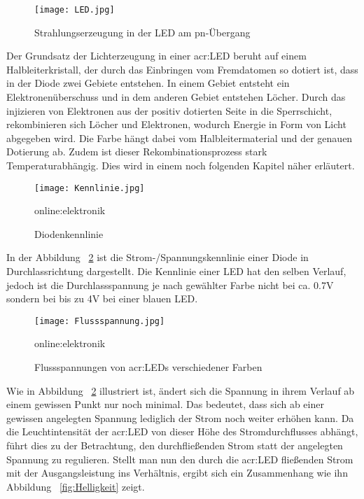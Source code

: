\begin{figure}[h]
	\centering
	\texttt{[image: LED.jpg]}
	\caption[Strahlungserzeugung in der LED am pn-Übergang]{Strahlungserzeugung in der LED am pn-Übergang} \cite{slabke}
	\label{fig:LED}
\end{figure}

Der Grundsatz der Lichterzeugung in einer \gls{acr:LED} beruht auf einem Halbleiterkristall, der durch das Einbringen vom Fremdatomen so dotiert ist, dass in der Diode zwei Gebiete entstehen. In einem Gebiet entsteht ein Elektronenüberschuss und in dem anderen Gebiet entstehen Löcher. Durch das injizieren von Elektronen aus der positiv dotierten Seite in die Sperrschicht, rekombinieren sich Löcher und Elektronen, wodurch Energie in Form von Licht abgegeben wird.\cite{slabke} Die Farbe hängt dabei vom Halbleitermaterial und der genauen Dotierung ab. Zudem ist dieser Rekombinationsprozess stark Temperaturabhängig. Dies wird in einem noch folgenden Kapitel näher erläutert.

\begin{figure}[h]
	\centering
	\texttt{[image: Kennlinie.jpg]}
	\caption[Diodenkennlinie]{Diodenkennlinie} 
	\gls{online:elektronik}
	\label{fig:Kennlinie}
\end{figure}


In der Abbildung ~\ref{fig:Kennlinie} ist die Strom-/Spannungskennlinie einer Diode in Durchlassrichtung
dargestellt. Die Kennlinie einer LED hat den selben Verlauf, jedoch ist die Durchlassspannung
je nach gewählter Farbe nicht bei ca. 0.7V sondern bei bis zu 4V bei
einer blauen LED. 

\begin{figure}[h]
	\centering
	\texttt{[image: Flussspannung.jpg]}
	\caption[Flussspannungen von \gls{acr:LED}s verschiedener Farben]{Flussspannungen von \gls{acr:LED}s verschiedener Farben} 
	\gls{online:elektronik}
	\label{fig:Flussspannung}
\end{figure}

Wie in Abbildung ~\ref{fig:Kennlinie} illustriert ist, ändert sich die Spannung in ihrem Verlauf
ab einem gewissen Punkt nur noch minimal. Das bedeutet, dass sich ab einer gewissen
angelegten Spannung lediglich der Strom noch weiter erhöhen kann. Da die
Leuchtintensität der \gls{acr:LED} von dieser Höhe des Stromdurchflusses abhängt, führt dies zu der
Betrachtung, den durchfließenden Strom statt der angelegten Spannung zu regulieren.
Stellt man nun den durch die \gls{acr:LED} fließenden Strom mit der Ausgangsleistung
ins Verhältnis, ergibt sich ein Zusammenhang wie ihn Abbildung ~\ref{fig:Helligkeit} zeigt. 

